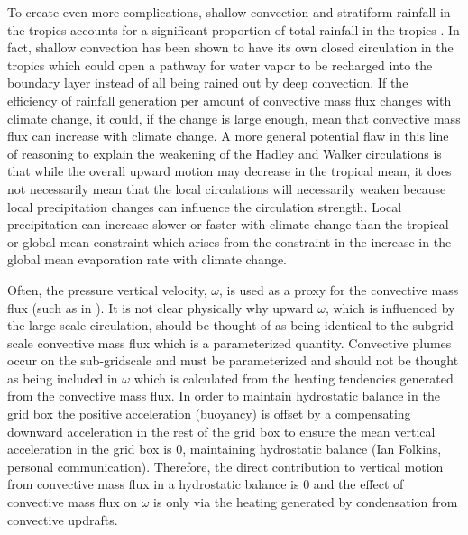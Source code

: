 \documentclass[letterpaper,12pt,titlepage,oneside,final]{book}
\begin{document}
To create even more complications, shallow convection and stratiform rainfall in the tropics accounts for a significant proportion of total rainfall in the tropics \citep{schumacher_stratiform_2003}. In fact, shallow convection has been shown to have its own closed circulation in the tropics \citep{folkins_ian_low-level_2008} which could open a pathway for water vapor to be recharged into the boundary layer instead of all being rained out by deep convection. If the efficiency of rainfall generation per amount of convective mass flux changes with climate change, it could, if the change is large enough, mean that convective mass flux can increase with climate change. A more general potential flaw in this line of reasoning to explain the weakening of the Hadley and Walker circulations is that while the overall upward motion may decrease in the tropical mean, it does not necessarily mean that the local circulations will necessarily weaken \citep{merlis_changes_2011} because local precipitation changes can influence the circulation strength. Local precipitation can increase slower or faster with climate change than the tropical or global mean constraint which arises from the constraint in the increase in the global mean evaporation rate with climate change. 

Often, the pressure vertical velocity, $\omega$, is used as a proxy for the convective mass flux (such as in \cite{vecchi_global_2007,schneider_water_2010}). It is not clear physically why upward $\omega$, which is influenced by the large scale circulation, should be thought of as being identical to the subgrid scale convective mass flux which is a parameterized quantity. Convective plumes occur on the sub-gridscale and must be parameterized and should not be thought as being included in $\omega$ which is calculated from the heating tendencies generated from the convective mass flux. In order to maintain hydrostatic balance in the grid box the positive acceleration (buoyancy) is offset by a compensating downward acceleration in the rest of the grid box to ensure the mean vertical acceleration in the grid box is 0, maintaining hydrostatic balance (Ian Folkins, personal communication).  Therefore, the direct contribution to vertical motion from convective mass flux in a hydrostatic balance is 0 and the effect of convective mass flux on $\omega$ is only via the heating generated by condensation from convective updrafts.
\end{document}
